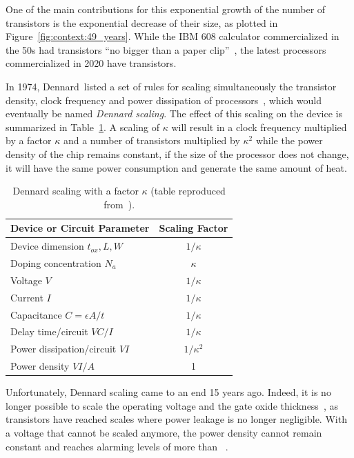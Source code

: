         One of the main contributions for this exponential growth of the number of transistors is the exponential
        decrease of their size, as plotted in Figure~\ref{fig:context:49_years}. While the IBM 608 calculator
        commercialized in the 50s had transistors ``no bigger than a paper clip''~\cite{ibm608}, the latest processors
        commercialized in 2020 have  transistors.

        In 1974, Dennard~\etal listed a set of rules for scaling simultaneously the transistor density, clock frequency
        and power dissipation of processors~\cite{dennard}, which would eventually be named \emph{Dennard scaling}. The
        effect of this scaling on the device is summarized in Table~\ref{tab:dennard}. A scaling of \(\kappa\) will
        result in a clock frequency multiplied by a factor \(\kappa\) and a number of transistors multiplied by
        \(\kappa^2\) while the power density of the chip remains constant, \ie if the size of the processor does not
        change, it will have the same power consumption and generate the same amount of heat.

        \begin{table}[htpb]
            \centering
            \caption{Dennard scaling with a factor \(\kappa\) (table reproduced from~\cite[Table 1]{dennard}).}
            \label{tab:dennard}
            \begin{tabular}{l|c}
                Device or Circuit Parameter & Scaling Factor\\
                \hline
                Device dimension \(t_{ox}, L, W\) & \(1/\kappa\)\\
                Doping concentration \(N_a\) & \(\kappa\)\\
                Voltage \(V\) & \(1/\kappa\)\\
                Current \(I\) & \(1/\kappa\)\\
                Capacitance \(C=\epsilon A/t\) & \(1/\kappa\)\\
                Delay time/circuit \(VC/I\) & \(1/\kappa\)\\
                Power dissipation/circuit \(VI\) & \(1/\kappa^2\)\\
                Power density \(VI/A\) & 1\\
            \end{tabular}
        \end{table}

        Unfortunately, Dennard scaling came to an end 15 years ago. Indeed, it is no longer possible to scale the
        operating voltage and the gate oxide thickness~\cite{Bohr_2007}, as transistors have reached scales where power
        leakage is no longer negligible. With a voltage that cannot be scaled anymore, the power density cannot remain
        constant and reaches alarming levels of more than
        ~\cite{Hennessy_2019,Hennessy_youtube}.


